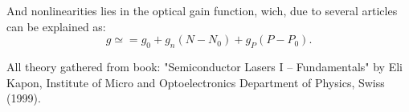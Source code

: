 And nonlinearities lies in the optical gain function, wich, due to several articles can be explained as:
\begin{equation}
	g \simeq = g_0  + g_n(N-N_0) + g_P(P- P_0).
\end{equation}

All theory gathered from book: "Semiconductor Lasers I -- Fundamentals" by Eli Kapon, Institute of Micro and Optoelectronics Department of Physics, Swiss (1999).

